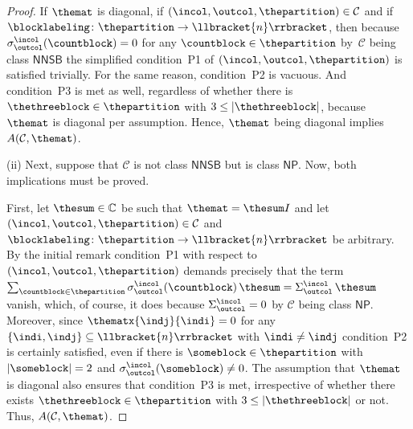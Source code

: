 \documentclass[10pt,a4paper]{amsart}
\numberwithin{equation}{section}
\newcommand{\identitymatrix}{I}
\newcommand{\comps}{\mathbb{C}}
\newcommand{\dwi}[1]{\llbracket{#1}\rrbracket}
\newcommand{\xfromto}[3]{#1 \colon  #2 \to #3}
\newcommand{\tcsx}[2]{\Sigma^{#1}_{#2}}
\newcommand{\csx}[3]{\sigma^{#1}_{#2}(#3)}
\newcommand{\thedim}{n}
\newcommand{\thecat}{\mathcal{C}}
\newcommand{\thepredicatex}[2]{A(#1,#2)}
\newcommand{\conditionone}{P1}
\newcommand{\conditiontwo}{P2}
\newcommand{\conditionthree}{P3}
\newcommand{\onlyneutralnonsingletonblocks}{\mathsf{NNSB}}
\newcommand{\onlyneutralpartitions}{\mathsf{NP}}
\begin{document}
{\begin{proof}
    If $\themat$ is diagonal, if $(\incol,\outcol,\thepartition)\in\thecat$ and if $\xfromto{\blocklabeling}{\thepartition}{\dwi{\thedim}}$, then because  $\csx{\incol}{\outcol}{\countblock}=0$ for any $\countblock\in\thepartition$ by~$\thecat$ being class $\onlyneutralnonsingletonblocks$ the simplified con\-di\-tion~\conditionone{} of $(\incol,\outcol,\thepartition)$ is satisfied trivially. For the same reason, con\-di\-tion~\conditiontwo{} is vacuous. And con\-di\-tion~\conditionthree{} is met as well, regardless of whether there is $\thethreeblock\in\thepartition$ with $3\leq|\thethreeblock|$, because $\themat$ is diagonal per assumption. Hence, $\themat$ being diagonal implies $\thepredicatex{\thecat}{\themat}$.

    (ii)
 Next, suppose that $\thecat$ is not class $\onlyneutralnonsingletonblocks$ but is class $\onlyneutralpartitions$. Now, both implications must be proved.

First, let  $\thesum\in\comps$ be such that $\themat=\thesum\identitymatrix$ and let $(\incol,\outcol,\thepartition)\in\thecat$ and $\xfromto{\blocklabeling}{\thepartition}{\dwi{\thedim}}$ be arbitrary. By the initial remark  con\-di\-tion~\conditionone{} with respect to $(\incol,\outcol,\thepartition)$ demands precisely that the term $\sum_{\countblock\in\thepartition}\csx{\incol}{\outcol}{\countblock}\,\thesum=\tcsx{\incol}{\outcol}\,\thesum$ vanish, which, of course, it does because $\tcsx{\incol}{\outcol}=0$ by $\thecat$ being class $\onlyneutralpartitions$. Moreover, since $\thematx{\indj}{\indi}=0$ for any $\{\indi,\indj\}\subseteq \dwi{\thedim}$ with $\indi\neq \indj$ con\-di\-tion~\conditiontwo{} is certainly satisfied, even if there is $\someblock\in\thepartition$  with $|\someblock|=2$ and $\csx{\incol}{\outcol}{\someblock}\neq 0$. The assumption that $\themat$ is diagonal also ensures that con\-di\-tion~\conditionthree{} is met, irrespective of whether there exists $\thethreeblock\in\thepartition$ with $3\leq|\thethreeblock|$ or not. Thus, $\thepredicatex{\thecat}{\themat}$.


\end{proof}}
\end{document}
